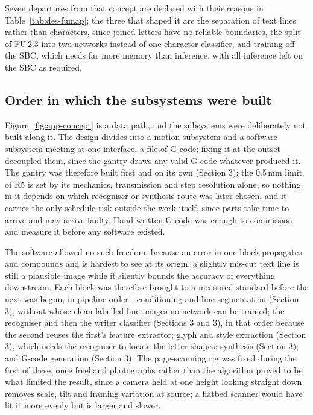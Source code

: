 Seven departures from that concept are declared with their reasons in Table~\ref{tab:des-fumap}; the three that shaped it are the separation of text lines rather than characters, since joined letters have no reliable boundaries, the split of FU\,2.3 into two networks instead of one character classifier, and training off the SBC, which needs far more memory than inference, with all inference left on the SBC as required.   

\subsection{Order in which the subsystems were built}
\label{sec:app-order}

Figure~\ref{fig:app-concept} is a data path, and the subsystems were deliberately not built along it. The design divides into a motion subsystem and a software subsystem meeting at one interface, a file of G-code; fixing it at the outset decoupled them, since the gantry draws any valid G-code whatever produced it. The gantry was therefore built first and on its own (Section 3): the 0.5\,mm limit of R5 is set by its mechanics, transmission and step resolution alone, so nothing in it depends on which recogniser or synthesis route was later chosen, and it carries the only schedule risk outside the work itself, since parts take time to arrive and may arrive faulty. Hand-written G-code was enough to commission and measure it before any software existed.

The software allowed no such freedom, because an error in one block propagates and compounds and is hardest to see at its origin: a slightly mis-cut text line is still a plausible image while it silently bounds the accuracy of everything downstream. Each block was therefore brought to a measured standard before the next was begun, in pipeline order - conditioning and line segmentation (Section 3), without whose clean labelled line images no network can be trained; the recogniser and then the writer classifier (Sections 3 and 3), in that order because the second reuses the first's feature extractor; glyph and style extraction (Section 3), which needs the recogniser to locate the letter shapes; synthesis (Section 3); and G-code generation (Section 3). The page-scanning rig was fixed during the first of these, once freehand photographs rather than the algorithm proved to be what limited the result, since a camera held at one height looking straight down removes scale, tilt and framing variation at source; a flatbed scanner would have lit it more evenly but is larger and slower.

